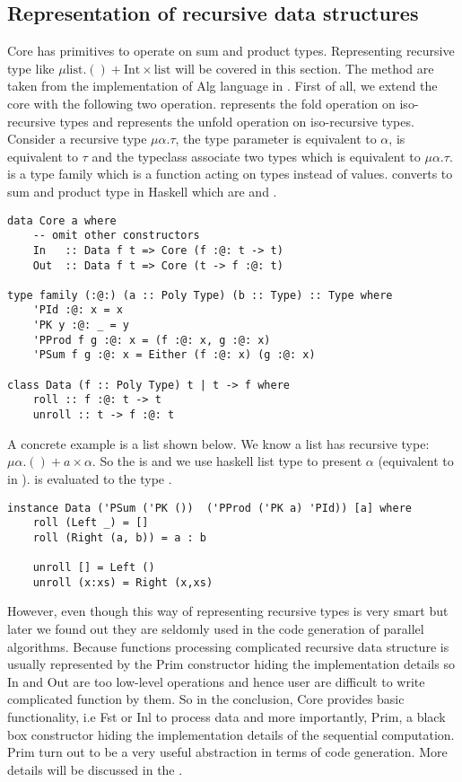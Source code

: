 \subsection{Representation of recursive data structures}
Core has primitives to operate on sum and product types. Representing recursive type like $\mu \text{list}. () + \text{Int} \times \text{list}$ will be covered in this section. The method are taken from the implementation of Alg language in \cite{AlgebraicMultipartyProtocol}. First of all, we extend the core with the following two operation.  represents the fold operation on iso-recursive types and  represents the unfold operation on iso-recursive types. Consider a recursive type $\mu \alpha. \tau$, the type parameter  is equivalent to $\alpha$,  is equivalent to $\tau$ and the typeclass  associate two types which is equivalent to $\mu \alpha. \tau$.  is a type family which is a function acting on types instead of values.  converts  to sum and product type in Haskell which are \hask{(,)} and .
\begin{verbatim}
data Core a where
    -- omit other constructors
    In   :: Data f t => Core (f :@: t -> t)
    Out  :: Data f t => Core (t -> f :@: t)

type family (:@:) (a :: Poly Type) (b :: Type) :: Type where
    'PId :@: x = x
    'PK y :@: _ = y
    'PProd f g :@: x = (f :@: x, g :@: x)
    'PSum f g :@: x = Either (f :@: x) (g :@: x)

class Data (f :: Poly Type) t | t -> f where
    roll :: f :@: t -> t
    unroll :: t -> f :@: t
\end{verbatim}
A concrete example is a list shown below. We know a list has recursive type: $\mu \alpha. () + a \times \alpha$. So the  is  and we use haskell list type \hask{[a]} to present $\alpha$ (equivalent to  in  ).  is evaluated to the type .
\begin{verbatim}
instance Data ('PSum ('PK ())  ('PProd ('PK a) 'PId)) [a] where
    roll (Left _) = []
    roll (Right (a, b)) = a : b
  
    unroll [] = Left ()
    unroll (x:xs) = Right (x,xs)
\end{verbatim}

However, even though this way of representing recursive types is very smart but later we found out they are seldomly used in the code generation of parallel algorithms. Because functions processing complicated recursive data structure is usually represented by the Prim constructor hiding the implementation details so In and Out are too low-level operations and hence user are difficult to write complicated function by them. So in the conclusion, Core provides basic functionality, i.e Fst or Inl to process data and more importantly, Prim, a black box constructor hiding the implementation details of the sequential computation. Prim turn out to be a very useful abstraction in terms of code generation. More details will be discussed in the .
